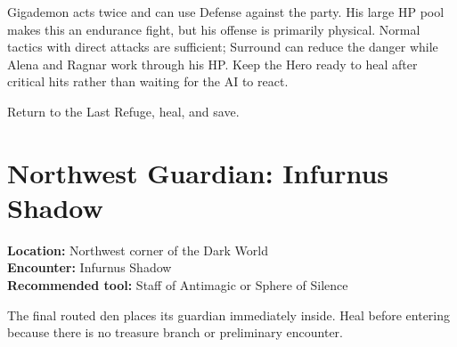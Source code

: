 \documentclass[
  american,
  10pt,
  letterpaper,
  oneside,
  open=any]{scrreprt}
\begin{document}
Gigademon acts twice and can use Defense against the party. His large HP
pool makes this an endurance fight, but his offense is primarily
physical. Normal tactics with direct attacks are sufficient; Surround
can reduce the danger while Alena and Ragnar work through his HP. Keep
the Hero ready to heal after critical hits rather than waiting for the
AI to react.

Return to the Last Refuge, heal, and save.

\section{Northwest Guardian: Infurnus
Shadow}\label{northwest-guardian-infurnus-shadow}

\textbf{Location:} Northwest corner of the Dark World\\
\textbf{Encounter:} Infurnus Shadow\\
\textbf{Recommended tool:} Staff of Antimagic or Sphere of Silence

The final routed den places its guardian immediately inside. Heal before
entering because there is no treasure branch or preliminary encounter.
\end{document}
